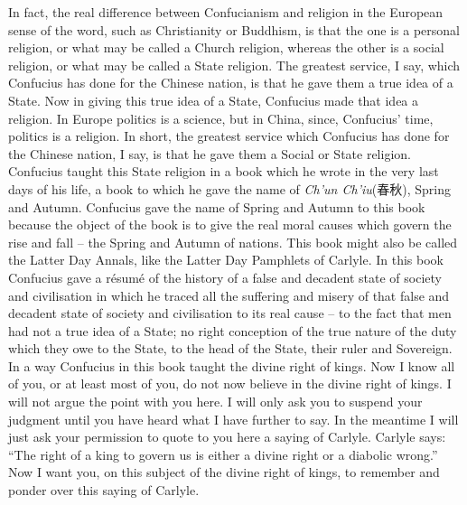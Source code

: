 In fact, the real difference between Confucianism and religion in the European sense of the word, such as Christianity or Buddhism, is that the one is a personal religion, or what may be called a Church religion, whereas the other is a social religion, or what may be called a State religion. The greatest service, I say, which Confucius has done for the Chinese nation, is that he gave them a true idea of a State. Now in giving this true idea of a State, Confucius made that idea a religion. In Europe politics is a science, but in China, since, Confucius' time, politics is a religion. In short, the greatest service which Confucius has done for the Chinese nation, I say, is that he gave them a Social or State religion. Confucius taught this State religion in a book which he wrote in the very last days of his life, a book to which he gave the name of \emph{Ch'un Ch'iu}(春秋), Spring and Autumn. Confucius gave the name of Spring and Autumn to this book because the object of the book is to give the real moral causes which govern the rise and fall -- the Spring and Autumn of nations. This book might also be called the Latter Day Annals, like the Latter Day Pamphlets of Carlyle. In this book Confucius gave a r\'esum\'e of the history of a false and decadent state of society and civilisation in which he traced all the suffering and misery of that false and decadent state of society and civilisation to its real cause -- to the fact that men had not a true idea of a State; no right conception of the true nature of the duty which they owe to the State, to the head of the State, their ruler and Sovereign. In a way Confucius in this book taught the divine right of kings. Now I know all of you, or at least most of you, do not now believe in the divine right of kings. I will not argue the point with you here. I will only ask you to suspend your judgment until you have heard what I have further to say. In the meantime I will just ask your permission to quote to you here a saying of Carlyle. Carlyle says: ``The right of a king to govern us is either a divine right or a diabolic wrong.'' Now I want you, on this subject of the divine right of kings, to remember and ponder over this saying of Carlyle.

